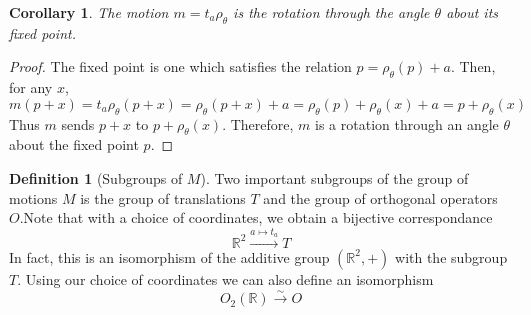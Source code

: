 \documentclass[12pt]{article}
\newtheorem{cor}[thm]{Corollary}
\theoremstyle{definition}
\newtheorem{defn}[thm]{Definition}
\theoremstyle{remark}
\numberwithin{equation}{section}
\newcommand\R{\mathbb R}    %
\begin{document}
\begin{cor}
        The motion $m = t_a\rho_{\theta}$ is the rotation through the angle $\theta$ about its fixed point.
\end{cor}
\begin{proof}
        The fixed point is one which satisfies the relation $p = \rho_{\theta}(p) + a$. Then, for any $x$, \begin{equation}
                m(p+x) = t_a\rho_{\theta}(p+x) = \rho_{\theta}(p+x) + a = \rho_{\theta}(p) + \rho_{\theta}(x) + a = p + \rho_{\theta}(x)
        \end{equation}
        Thus $m$ sends $p + x$ to $p + \rho_{\theta}(x)$. Therefore, $m$ is a rotation through an angle $\theta$ about the fixed point $p$.
\end{proof}


\vspace{15pt}

\begin{defn}[Subgroups of $M$]
        Two important subgroups of the group of motions $M$ is the group of translations $T$ and the group of orthogonal operators $O$.Note that with a choice of coordinates, we obtain a bijective correspondance \begin{equation}
                \R^2 \xrightarrow{a\mapsto t_a} T
        \end{equation}
        In fact, this is an isomorphism of the additive group $(\R^2,+)$ with the subgroup $T$. Using our choice of coordinates we can also define an isomorphism \begin{equation}
                O_2(\R) \xrightarrow{\sim} O
        \end{equation}
\end{defn}

\vspace{15pt}
\end{document}
